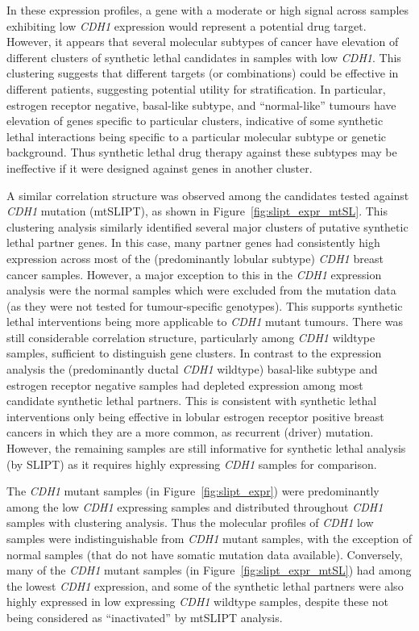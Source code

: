 In these expression profiles, a gene with a moderate or high signal across samples exhibiting low \textit{CDH1} expression would represent a potential drug target. However, it appears that several molecular subtypes of cancer have elevation of different clusters of synthetic lethal candidates in samples with low \textit{CDH1}. This clustering suggests that different targets (or combinations) could be effective in different patients, suggesting potential utility for stratification.  In particular, estrogen receptor negative, basal-like subtype, and ``normal-like'' tumours \citep{Eroles2012, Parker2009, Dai2015} have elevation of genes specific to particular clusters, indicative of some synthetic lethal interactions being specific to a particular molecular subtype or genetic background. Thus synthetic lethal drug therapy against these subtypes may be ineffective if it were designed against genes in another cluster.
 
A similar correlation structure was observed among the candidates tested against \textit{CDH1} mutation (mtSLIPT), as shown in Figure~\ref{fig:slipt_expr_mtSL}. This clustering analysis similarly identified several major clusters of putative synthetic lethal partner genes. In this case, many partner genes had consistently high expression across most of the (predominantly lobular subtype) \textit{CDH1} breast cancer samples. However, a major exception to this in the \textit{CDH1} expression analysis were the normal samples which were excluded from the mutation data (as they were not tested for tumour-specific genotypes). This supports synthetic lethal interventions being more applicable to \textit{CDH1} mutant tumours. There was still considerable correlation structure, particularly among \textit{CDH1} wildtype samples, sufficient to distinguish gene clusters. In contrast to the expression analysis the (predominantly ductal \textit{CDH1} wildtype) basal-like subtype and estrogen receptor negative samples had depleted expression among most candidate synthetic lethal partners. This is consistent with synthetic lethal interventions only being effective in lobular estrogen receptor positive breast cancers in which they are a more common, as recurrent (driver) mutation. However, the remaining samples are still informative for synthetic lethal analysis (by \gls{SLIPT}) as it requires highly expressing \textit{CDH1} samples for comparison.

\FloatBarrier

The \textit{CDH1} mutant samples (in Figure~\ref{fig:slipt_expr}) were predominantly among the low \textit{CDH1} expressing samples and distributed throughout \textit{CDH1} samples with clustering analysis. Thus the molecular profiles of \textit{CDH1} low samples were indistinguishable from \textit{CDH1} mutant samples, with the exception of normal samples (that do not have somatic mutation data available). Conversely, many of the \textit{CDH1} mutant samples (in Figure~\ref{fig:slipt_expr_mtSL}) had among the lowest \textit{CDH1} expression, and some of the synthetic lethal partners were also highly expressed in low expressing \textit{CDH1} wildtype samples, despite these not being considered as ``inactivated'' by mtSLIPT analysis.

